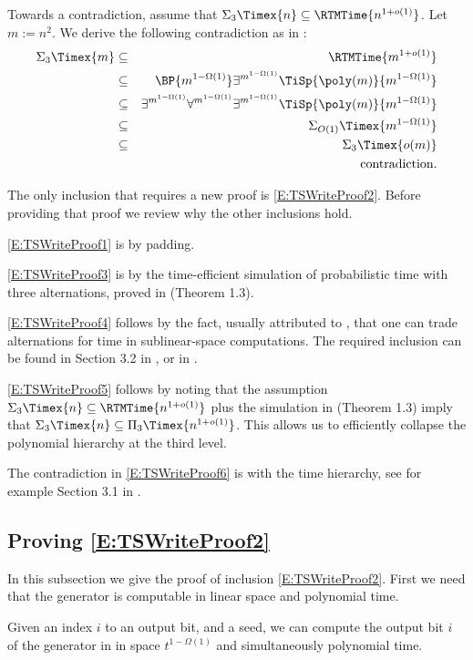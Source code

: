 Towards a contradiction, assume that $\Sigma_{3}\Timex{n}\subseteq\RTMTime{n^{1+o(1)}}$.
Let $m:=n^{2}$. We derive the following contradiction as in \cite{ViolaBPvsE}:
\begin{eqnarray}
\Sigma_{3}\Timex{m} & \subseteq & \RTMTime{m^{1+o(1)}}\label{E:TSWriteProof1}\\
 & \subseteq & \BP{m^{1-\Omega(1)}}\exists^{m^{1-\Omega(1)}}\TiSp{\poly(m)}{m^{1-\Omega(1)}}\label{E:TSWriteProof2}\\
 & \subseteq & \exists^{m^{1-\Omega(1)}}\forall^{m^{1-\Omega(1)}}\exists^{m^{1-\Omega(1)}}\TiSp{\poly(m)}{m^{1-\Omega(1)}}\label{E:TSWriteProof3}\\
 & \subseteq & \Sigma_{O(1)}\Timex{m^{1-\Omega(1)}}\label{E:TSWriteProof4}\\
 & \subseteq & \Sigma_{3}\Timex{o(m)}\label{E:TSWriteProof5}\\
 &  & \mathrm{contradiction.}\label{E:TSWriteProof6}
\end{eqnarray}

The only inclusion that requires a new proof is \eqref{E:TSWriteProof2}.
Before providing that proof we review why the other inclusions hold.

\eqref{E:TSWriteProof1} is by padding.

\eqref{E:TSWriteProof3} is by the time-efficient simulation of probabilistic
time with three alternations, proved in \cite{ViolaBPvsE} (Theorem
1.3).

\eqref{E:TSWriteProof4} follows by the fact, usually attributed to
\cite{Nep70}, that one can trade alternations for time in sublinear-space
computations. The required inclusion can be found in Section 3.2 in
\cite{vMe04}, or in \cite{FLvMV05}.

\eqref{E:TSWriteProof5} follows by noting that the assumption $\Sigma_{3}\Timex{n}\subseteq\RTMTime{n^{1+o(1)}}$
plus the simulation in \cite{ViolaBPvsE} (Theorem 1.3) imply that
$\Sigma_{3}\Timex{n}\subseteq\Pi_{3}\Timex{n^{1+o(1)}}$. This allows
us to efficiently collapse the polynomial hierarchy at the third level.

The contradiction in \eqref{E:TSWriteProof6} is with the time hierarchy,
see for example Section 3.1 in \cite{vMe04}.

\subsection{Proving \eqref{E:TSWriteProof2}}

In this subsection we give the proof of inclusion \eqref{E:TSWriteProof2}.
First we need that the generator is computable in linear space and
polynomial time.
\begin{claim}
\label{claim:G-small-space} Given an index $i$ to an output bit,
and a seed, we can compute the output bit $i$ of the generator in
 in space $t^{1-\Omega(1)}$ and simultaneously
polynomial time.
\end{claim}

